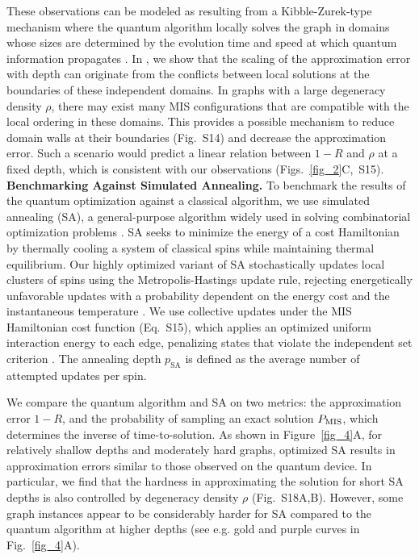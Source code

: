 \documentclass[twocolumn,amssymb,secnumarabic, prl, aps, nofootinbib]{revtex4-1}
\newcommand{\PMIS}{P_\textnormal{MIS}}
\begin{document}

These observations can be modeled as resulting from a Kibble-Zurek-type mechanism where the quantum algorithm locally solves the graph in domains whose sizes are determined by the evolution time and speed at which quantum information propagates \cite{zurek_dynamics_2005, Lieb_Robinson_Bound}. In \cite{SI}, we show that the scaling of the approximation error with depth can originate from the conflicts between local solutions at the boundaries of these independent domains. In graphs with a large degeneracy density $\rho$, there may exist many MIS configurations that are compatible with the local ordering in these domains. This provides a possible mechanism to reduce domain walls at their boundaries (Fig.~S14) and decrease the approximation error. Such a scenario would predict a linear relation between $1-R$ and $\rho$ at a fixed depth, which is consistent with our observations (Figs.~\ref{fig_2}C,~S15).\\



\noindent \textbf
{Benchmarking Against Simulated Annealing.}
To benchmark the results of the quantum optimization against a classical algorithm, we use simulated annealing (SA), a general-purpose algorithm widely used in solving combinatorial optimization problems \cite{Kirkpatrick_SA}. SA seeks to minimize the energy of a cost Hamiltonian by thermally cooling a system of classical spins while maintaining thermal equilibrium. Our highly optimized variant of SA stochastically updates local clusters of spins using the Metropolis-Hastings \cite{Metropolis} update rule, rejecting energetically unfavorable updates with a probability dependent on the energy cost and the instantaneous temperature  \cite{SI}. We use collective updates under the MIS Hamiltonian cost function (Eq.~S15), which applies an optimized uniform interaction energy to each edge, penalizing states that violate the independent set criterion \cite{SI}. The annealing depth $p_{\text{SA}}$ is defined as the average number of attempted updates per spin.

We compare the quantum algorithm and SA on two metrics:  the approximation error $1-R$, and  the probability of sampling an exact solution $\PMIS$, which determines the inverse of time-to-solution. As shown in Figure~\ref{fig_4}A,  for relatively shallow depths and moderately hard graphs, optimized SA results in approximation errors similar to those observed on the quantum device. In particular, we find that the hardness in approximating the solution for short SA depths is also controlled by degeneracy density $\rho$ (Fig.~S18A,B). However, some graph instances appear to be considerably harder for SA compared to the quantum algorithm at higher depths (see e.g. gold and purple curves in Fig.~\ref{fig_4}A).
\end{document}

